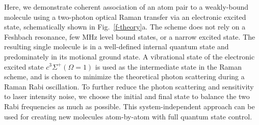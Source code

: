 \documentclass[aps,prl,twocolumn,superscriptaddress]{revtex4-1}
\begin{document}
Here, we demonstrate coherent association of an atom pair to a weakly-bound molecule using a two-photon optical Raman transfer via an electronic excited state, schematically shown in Fig.~\ref{f-theory}a. The scheme does not rely on a Feshbach resonance, few MHz level bound states, or a narrow excited state. The resulting single molecule is in a well-defined internal quantum state and predominately in its motional ground state. A vibrational state of the electronic excited state $c^3\Sigma^+(\Omega = 1)$ is used as the intermediate state in the Raman scheme, and is chosen to minimize the theoretical photon scattering during a Raman Rabi oscillation. To further reduce the photon scattering and sensitivity to laser intensity noise, we choose the initial and final state to balance the two Rabi frequencies as much as possible. This system-independent approach can be used for creating new molecules atom-by-atom with full quantum state control.





\end{document}
